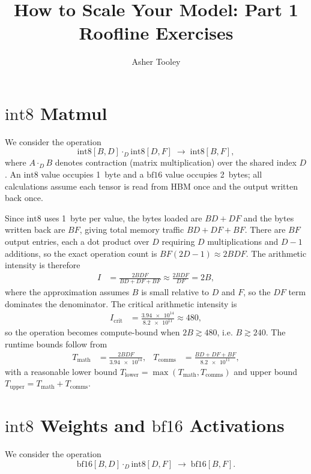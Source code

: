 \documentclass[11pt]{article}
\title{How to Scale Your Model: Part 1 Roofline Exercises}
\author{Asher Tooley}
\date{}
\newcommand{\dtype}[1]{\mathrm{#1}}          %
\newcommand{\contract}[1]{\cdot_{#1}}         %
\newcommand{\Tmath}{T_{\text{math}}}
\newcommand{\Tcomms}{T_{\text{comms}}}
\newcommand{\Icrit}{I_{\text{crit}}}
\begin{document}
\maketitle

\section{\texorpdfstring{\(\dtype{int8}\)}{int8} Matmul}

We consider the operation
\[
\dtype{int8}[B,D]\contract{D}\dtype{int8}[D,F]
\;\to\;
\dtype{int8}[B,F],
\]
where \(A \contract{D} B\) denotes contraction (matrix multiplication) over the
shared index \(D\). An \(\dtype{int8}\) value occupies \qty{1}{byte} and a
\(\dtype{bf16}\) value occupies \qty{2}{bytes}; all calculations assume each
tensor is read from HBM once and the output written back once.

Since \(\dtype{int8}\) uses \qty{1}{byte} per value, the bytes loaded are
\(BD + DF\) and the bytes written back are \(BF\), giving total memory traffic
\(BD + DF + BF\). There are \(BF\) output entries, each a dot product over \(D\)
requiring \(D\) multiplications and \(D-1\) additions, so the exact operation
count is \(BF(2D-1)\approx 2BDF\). The arithmetic intensity is therefore
\begin{align}
I
&= \frac{2BDF}{BD+DF+BF}
   \approx \frac{2BDF}{DF}
   = 2B,
\end{align}
where the approximation assumes \(B\) is small relative to \(D\) and \(F\), so the
\(DF\) term dominates the denominator. The critical arithmetic intensity is
\begin{align}
\Icrit
&= \frac{\num{3.94e14}}{\num{8.2e11}}
   \approx 480,
\end{align}
so the operation becomes compute-bound when \(2B \gtrsim 480\), i.e.
\(B \gtrsim 240\). The runtime bounds follow from
\begin{align}
\Tmath  &= \frac{2BDF}{\num{3.94e14}}, &
\Tcomms &= \frac{BD+DF+BF}{\num{8.2e11}},
\end{align}
with a reasonable lower bound \(T_{\text{lower}} = \max(\Tmath, \Tcomms)\) and
upper bound \(T_{\text{upper}} = \Tmath + \Tcomms\).

\section{\texorpdfstring{\(\dtype{int8}\)}{int8} Weights and \texorpdfstring{\(\dtype{bf16}\)}{bf16} Activations}

We consider the operation
\[
\dtype{bf16}[B,D]\contract{D}\dtype{int8}[D,F]
\;\to\;
\dtype{bf16}[B,F].
\]
\end{document}
